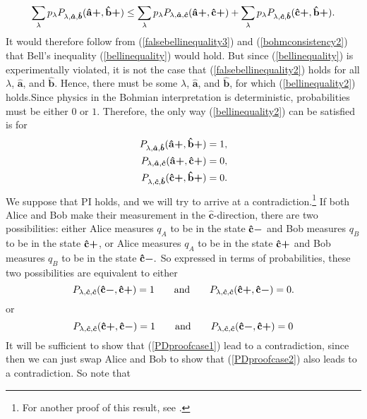 {\begin{equation}
\sum_\lambda p_{\lambda}P_{\lambda,\bm{\hat{a}},\bm{\hat{b}}}({\vb{\hat{{a}}}\bm{+}},{\vb{\hat{{b}}}\bm{+}})\leq \sum_\lambda p_{\lambda}P_{\lambda,\bm{\hat{a}},\bm{\hat{c}}}({\vb{\hat{{a}}}\bm{+}},{\vb{\hat{{c}}}\bm{+}})+\sum_\lambda p_{\lambda} P_{\lambda,\bm{\hat{c}},\bm{\hat{b}}}({\vb{\hat{{c}}}\bm{+}},{\vb{\hat{{b}}}\bm{+}}).
\end{equation} 
It would therefore follow from (\ref{falsebellinequality3}) and  (\ref{bohmconsistency2}) that Bell's inequality (\ref{bellinequality}) would hold. But since (\ref{bellinequality}) is experimentally violated, it is not the case that (\ref{falsebellinequality2}) holds for all $\lambda$, $\bm{\hat{a}}$, and $\bm{\hat{b}}$. Hence, there must be some $\lambda$, $\bm{\hat{a}}$, and $\bm{\hat{b}}$,  for which (\ref{bellinequality2}) holds.}Since physics in the Bohmian interpretation is deterministic, probabilities must be either $0$ or $1$. Therefore, the only way (\ref{bellinequality2}) can be satisfied is for
 \begin{align}
P_{\lambda,\bm{\hat{a}},\bm{\hat{b}}}({\vb{\hat{{a}}}\bm{+}},{\vb{\hat{{b}}}\bm{+}})&=1, \label{PDproof1}\\
P_{\lambda,\bm{\hat{a}},\bm{\hat{c}}}({\vb{\hat{{a}}}\bm{+}},{\vb{\hat{{c}}}\bm{+}})&=0,\label{PDproof2}\\
P_{\lambda,\bm{\hat{c}},\bm{\hat{b}}}({\vb{\hat{{c}}}\bm{+}},{\vb{\hat{{b}}}\bm{+}})&=0. \label{PDproof3}
 \end{align}
 We suppose that PI holds, and we will try to arrive at a contradiction.\footnote{For another proof of this result, see \cite{BellJ.S.1964OtEP}.} If both Alice and Bob make their measurement in the $\bm{\hat{c}}$-direction, there are two possibilities: either Alice measures $q_A$ to be in the state ${\vb{\hat{{c}}}\bm{-}}$ and Bob measures $q_B$ to be in the state ${\vb{\hat{{c}}}\bm{+}}$, or Alice measures $q_A$ to be in the state ${\vb{\hat{{c}}}\bm{+}}$ and Bob measures $q_B$ to be in the state ${\vb{\hat{{c}}}\bm{-}}.$ So expressed in terms of probabilities, these two possibilities are equivalent to either 
 \begin{equation}\label{PDproofcase1}
 P_{\lambda,\bm{\hat{c}},\bm{\hat{c}}}({\vb{\hat{{c}}}\bm{-}},{\vb{\hat{{c}}}\bm{+}})=1 \qquad\text{and}\qquad  P_{\lambda,\bm{\hat{c}},\bm{\hat{c}}}({\vb{\hat{{c}}}\bm{+}},{\vb{\hat{{c}}}\bm{-}})=0.
 \end{equation}
 or 
  \begin{equation}\label{PDproofcase2}
 P_{\lambda,\bm{\hat{c}},\bm{\hat{c}}}({\vb{\hat{{c}}}\bm{+}},{\vb{\hat{{c}}}\bm{-}})=1 \qquad\text{and}\qquad P_{\lambda,\bm{\hat{c}},\bm{\hat{c}}}({\vb{\hat{{c}}}\bm{-}},{\vb{\hat{{c}}}\bm{+}})=0
 \end{equation}
 It will be sufficient to show that (\ref{PDproofcase1}) lead to a contradiction, since then we can just swap Alice and Bob to show that (\ref{PDproofcase2}) also leads to a contradiction. So note that
